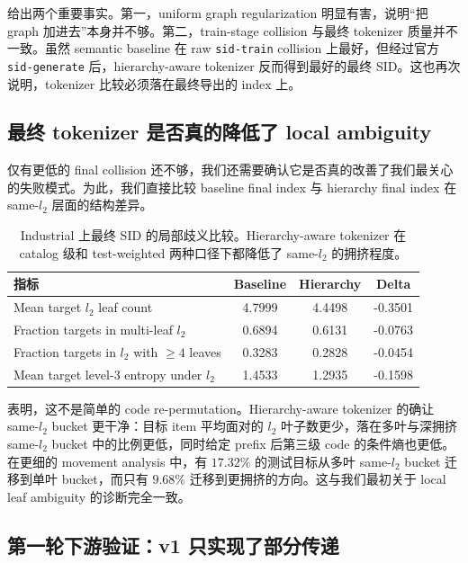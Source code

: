  给出两个重要事实。第一，uniform graph regularization 明显有害，说明“把 graph 加进去”本身并不够。第二，train-stage collision 与最终 tokenizer 质量并不一致。虽然 semantic baseline 在 raw \texttt{sid-train} collision 上最好，但经过官方 \texttt{sid-generate} 后，hierarchy-aware tokenizer 反而得到最好的最终 SID。这也再次说明，tokenizer 比较必须落在最终导出的 index 上。

\subsection{最终 tokenizer 是否真的降低了 local ambiguity}

仅有更低的 final collision 还不够，我们还需要确认它是否真的改善了我们最关心的失败模式。为此，我们直接比较 baseline final index 与 hierarchy final index 在 same-$l_2$ 层面的结构差异。

\begin{table}[t]
  \centering
  \caption{Industrial 上最终 SID 的局部歧义比较。Hierarchy-aware tokenizer 在 catalog 级和 test-weighted 两种口径下都降低了 same-$l_2$ 的拥挤程度。}
  \label{tab:ambiguity}
  \begin{tabular}{lccc}
    \toprule
    指标 & Baseline & Hierarchy & Delta \\
    \midrule
    Mean target $l_2$ leaf count & 4.7999 & 4.4498 & -0.3501 \\
    Fraction targets in multi-leaf $l_2$ & 0.6894 & 0.6131 & -0.0763 \\
    Fraction targets in $l_2$ with $\ge 4$ leaves & 0.3283 & 0.2828 & -0.0454 \\
    Mean target level-3 entropy under $l_2$ & 1.4533 & 1.2935 & -0.1598 \\
    \bottomrule
  \end{tabular}
\end{table}

 表明，这不是简单的 code re-permutation。Hierarchy-aware tokenizer 的确让 same-$l_2$ bucket 更干净：目标 item 平均面对的 $l_2$ 叶子数更少，落在多叶与深拥挤 same-$l_2$ bucket 中的比例更低，同时给定 prefix 后第三级 code 的条件熵也更低。在更细的 movement analysis 中，有 $17.32\%$ 的测试目标从多叶 same-$l_2$ bucket 迁移到单叶 bucket，而只有 $9.68\%$ 迁移到更拥挤的方向。这与我们最初关于 local leaf ambiguity 的诊断完全一致。

\subsection{第一轮下游验证：v1 只实现了部分传递}

